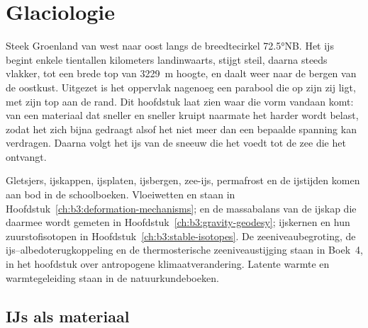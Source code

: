 \chapter{Glaciologie}\label{ch:b3:glaciology}

Steek Groenland van west naar oost langs de breedtecirkel \ang{72.5}NB. Het ijs
begint enkele tientallen kilometers landinwaarts, stijgt steil, daarna steeds
vlakker, tot een brede top van \qty{3229}{m} hoogte, en daalt weer naar de bergen van de
oostkust. Uitgezet is het oppervlak nagenoeg een parabool die op zijn zij
ligt, met zijn top aan de rand. Dit hoofdstuk laat zien waar die vorm vandaan
komt: van een materiaal dat sneller en sneller kruipt naarmate het harder wordt
belast, zodat het zich bijna gedraagt alsof het niet meer dan een bepaalde spanning kan verdragen.
Daarna volgt het ijs van de sneeuw die het voedt tot de
zee die het ontvangt.

\begin{recall}
Gletsjers, ijskappen, ijsplaten, ijsbergen, zee-ijs, permafrost en de ijstijden
komen aan bod in de schoolboeken. Vloeiwetten en  staan in
Hoofdstuk~\ref{ch:b3:deformation-mechanisms};  en de
massabalans van de ijskap die daarmee wordt gemeten in Hoofdstuk~\ref{ch:b3:gravity-geodesy};
ijskernen en hun zuurstofisotopen in Hoofdstuk~\ref{ch:b3:stable-isotopes}.
De zeeniveaubegroting, de ijs--albedoterugkoppeling en de thermosterische
zeeniveaustijging staan in Boek~4, in het hoofdstuk over antropogene
klimaatverandering. Latente warmte en warmtegeleiding staan in de natuurkundeboeken.
\end{recall}

\section{IJs als materiaal}\label{sec:b3:glaciology:material}

